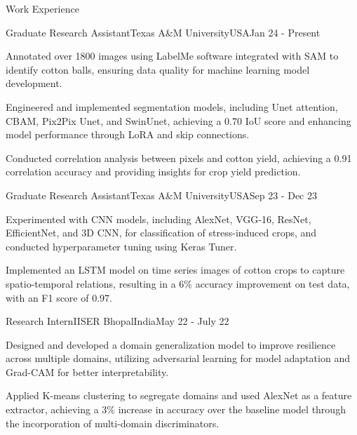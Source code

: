 \documentclass{resume}
\begin{document}
\begin{rSection}{Work Experience}
\vspace{-3pt}

\begin{rSubsectionWork}{Graduate Research Assistant}{Texas A\&M University}{USA}{Jan 24 - Present}

\vspace{-3pt}
\item Annotated over 1800 images using LabelMe software integrated with SAM to identify cotton balls, ensuring data quality for machine learning model development.
\vspace{-3pt}
\item Engineered and implemented segmentation models, including Unet attention, CBAM, Pix2Pix Unet, and SwinUnet, achieving a 0.70 IoU score and enhancing model performance through LoRA and skip connections.
\vspace{-3pt}
\item Conducted correlation analysis between pixels and cotton yield, achieving a 0.91 correlation accuracy and providing insights for crop yield prediction.
\end{rSubsectionWork}
\vspace{-3pt}

\begin{rSubsectionWork}{Graduate Research Assistant}{Texas A\&M University}{USA}{Sep 23 - Dec 23}

\vspace{-3pt}
\item Experimented with CNN models, including AlexNet, VGG-16, ResNet, EfficientNet, and 3D CNN, for classification of stress-induced crops, and conducted hyperparameter tuning using Keras Tuner.
\vspace{-3pt}
\item Implemented an LSTM model on time series images of cotton crops to capture spatio-temporal relations, resulting in a 6\% accuracy improvement on test data, with an F1 score of 0.97.
\end{rSubsectionWork}
\vspace{-3pt}

\begin{rSubsectionWork}{Research Intern}{IISER Bhopal}{India}{May 22 - July 22}

\vspace{-3pt}
\item Designed and developed a domain generalization model to improve resilience across multiple domains, utilizing adversarial learning for model adaptation and Grad-CAM for better interpretability.
\vspace{-3pt}
\item Applied K-means clustering to segregate domains and used AlexNet as a feature extractor, achieving a 3\% increase in accuracy over the baseline model through the incorporation of multi-domain discriminators.
\end{rSubsectionWork}
\vspace{-3pt}


\end{rSection}
\end{document}

